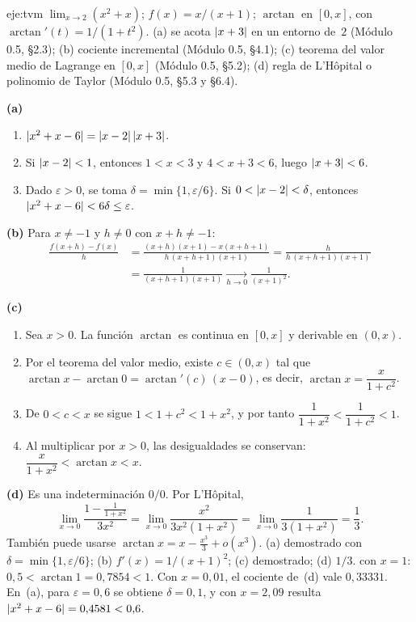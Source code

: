\begin{solucion}{eje:tvm}
\datos $\lim_{x\to2}(x^{2}+x)$; $f(x)=x/(x+1)$; $\arctan$ en $[0,x]$, con $\arctan'(t)=1/(1+t^{2})$.
\planteamiento (a) se acota $\lvert x+3\rvert$ en un entorno de~$2$ (Módulo 0.5, §2.3); (b) cociente incremental (Módulo 0.5, §4.1); (c) teorema del valor medio de Lagrange en $[0,x]$ (Módulo 0.5, §5.2); (d) regla de L'Hôpital o polinomio de Taylor (Módulo 0.5, §5.3 y §6.4).
\pasos

\noindent\textbf{(a)}
\begin{enumerate}[label=\arabic*.]
  \item $\lvert x^{2}+x-6\rvert=\lvert x-2\rvert\,\lvert x+3\rvert$.
  \item Si $\lvert x-2\rvert<1$, entonces $1<x<3$ y $4<x+3<6$, luego $\lvert x+3\rvert<6$.
  \item Dado $\varepsilon>0$, se toma $\delta=\min\{1,\varepsilon/6\}$. Si $0<\lvert x-2\rvert<\delta$, entonces $\lvert x^{2}+x-6\rvert<6\delta\le\varepsilon$.
\end{enumerate}

\noindent\textbf{(b)} Para $x\neq-1$ y $h\neq0$ con $x+h\neq-1$:
\[
\begin{aligned}
\frac{f(x+h)-f(x)}{h}&=\frac{(x+h)(x+1)-x(x+h+1)}{h\,(x+h+1)(x+1)}=\frac{h}{h\,(x+h+1)(x+1)}\\
&=\frac{1}{(x+h+1)(x+1)}\xrightarrow[h\to0]{}\frac{1}{(x+1)^{2}}.
\end{aligned}
\]

\noindent\textbf{(c)}
\begin{enumerate}[label=\arabic*.]
  \item Sea $x>0$. La función $\arctan$ es continua en $[0,x]$ y derivable en $(0,x)$.
  \item Por el teorema del valor medio, existe $c\in(0,x)$ tal que $\arctan x-\arctan0=\arctan'(c)\,(x-0)$, es decir, $\arctan x=\dfrac{x}{1+c^{2}}$.
  \item De $0<c<x$ se sigue $1<1+c^{2}<1+x^{2}$, y por tanto $\dfrac{1}{1+x^{2}}<\dfrac{1}{1+c^{2}}<1$.
  \item Al multiplicar por $x>0$, las desigualdades se conservan: $\dfrac{x}{1+x^{2}}<\arctan x<x$.
\end{enumerate}

\noindent\textbf{(d)} Es una indeterminación $0/0$. Por L'Hôpital,
\[
\lim_{x\to0}\frac{1-\frac{1}{1+x^{2}}}{3x^{2}}=\lim_{x\to0}\frac{x^{2}}{3x^{2}(1+x^{2})}=\lim_{x\to0}\frac{1}{3(1+x^{2})}=\frac13 .
\]
También puede usarse $\arctan x=x-\frac{x^{3}}{3}+o(x^{3})$.
\resultado (a) demostrado con $\delta=\min\{1,\varepsilon/6\}$; (b) $f'(x)=1/(x+1)^{2}$; (c) demostrado; (d) $1/3$.
\comprobacion con $x=1$: $0{,}5<\arctan1=0{,}7854<1$. Con $x=0{,}01$, el cociente de~(d) vale $0{,}33331$. En~(a), para $\varepsilon=0{,}6$ se obtiene $\delta=0{,}1$, y con $x=2{,}09$ resulta $\lvert x^{2}+x-6\rvert=0{,}4581<0{,}6$.


\end{solucion}
